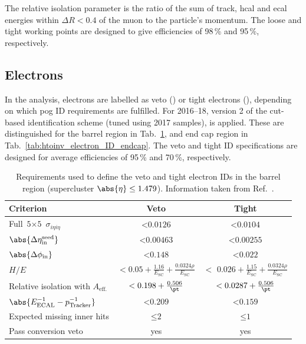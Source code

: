 The relative isolation parameter is the ratio of the sum of track, \acrshort{hcal} and \acrshort{ecal} energies within $\Delta R < \text{0.4}$ of the muon to the particle's momentum. The loose and tight working points are designed to give efficiencies of 98\,\% and 95\,\%, respectively.




\subsection{Electrons}
\label{subsec:htoinv_electron_objs}

In the analysis, electrons are labelled as veto (\vetoEle) or tight electrons (\tightEle), depending on which \acrshort{pog} ID requirements are fulfilled. For 2016--18, version 2 of the cut-based identification scheme (tuned using 2017 samples), is applied. These are distinguished for the barrel region in Tab.~\ref{tab:htoinv_electron_ID_barrel}, and end cap region in Tab.~\ref{tab:htoinv_electron_ID_endcap}. The veto and tight ID specifications are designed for average efficiencies of 95\,\% and 70\,\%, respectively.

\begin{table}[htbp]
    \centering
    \begin{tabular}{lcc}
    \hline
    Criterion & Veto & Tight \\\hline
    Full $\text{5} \times \text{5}$ $\sigma_{i\eta i\eta}$ & $< \text{0.0126}$ & $< \text{0.0104}$    \\
    $\abs{\Delta\eta_{\mathrm{in}}^{\mathrm{seed}}}$ & $< \text{0.00463}$ & $< \text{0.00255}$ \\
    $\abs{\Delta\phi_{\mathrm{in}}}$ & $< \text{0.148}$ & $< \text{0.022}$ \\
    $H/E$ & $<\text{0.05} + \frac{\text{1.16}}{E_{\mathrm{SC}}} + \frac{\text{0.0324}\rho}{E_{\mathrm{SC}}}$ & $<$ $\text{0.026} + \frac{\text{1.15}}{E_{\mathrm{SC}}} + \frac{\text{0.0324}\rho}{E_{\mathrm{SC}}}$ \\
    Relative isolation with $A_{\mathrm{eff.}}$ & $< \text{0.198} + \frac{\text{0.506}}{\pt}$ & $< \text{0.0287} + \frac{\text{0.506}}{\pt}$\\
    $\abs{E^{-1}_{\mathrm{ECAL}} - p^{-1}_{\mathrm{Tracker}}}$ & $< \text{0.209}$ & $< \text{0.159}$\\
    Expected missing inner hits & $\leq \text{2}$ & $\leq \text{1}$\\
    Pass conversion veto & yes & yes \\
    \hline
    \end{tabular}
    \caption[Requirements used to define the veto and tight electron IDs in the barrel region (supercluster $\abs{\eta} \leq \text{1.479}$)]{Requirements used to define the veto and tight electron IDs in the barrel region (supercluster $\abs{\eta} \leq \text{1.479}$). Information taken from Ref.~.}
    \label{tab:htoinv_electron_ID_barrel}
\end{table}

